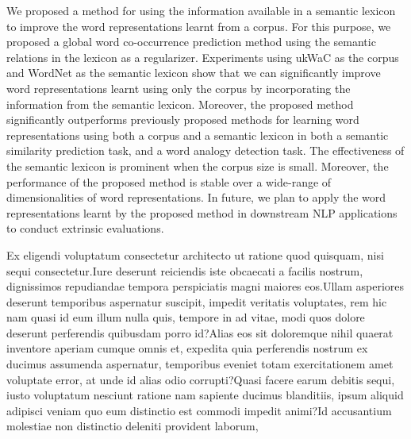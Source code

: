 \documentclass[letterpaper]{article}
\begin{document}
We proposed a method for using the information available in a semantic lexicon to improve the word representations
learnt from a corpus. For this purpose, we proposed a global word co-occurrence prediction method using the semantic relations
in the lexicon as a regularizer. Experiments using ukWaC as the corpus and WordNet as the semantic lexicon show that
we can significantly improve word representations learnt using only the corpus by incorporating the information from the semantic lexicon.
Moreover, the proposed method significantly outperforms previously proposed methods for learning word representations
using both a corpus and a semantic lexicon in both a semantic similarity prediction task, and a word analogy detection task.
The effectiveness of the semantic lexicon is prominent when the corpus size is small. Moreover, the performance
of the proposed method is stable over a wide-range of dimensionalities of word representations.
In future, we plan to apply the word representations learnt by the proposed method in downstream NLP applications
to conduct extrinsic evaluations.


  Ex eligendi voluptatum consectetur architecto ut ratione quod quisquam, nisi sequi consectetur.Iure deserunt reiciendis iste obcaecati a facilis nostrum, dignissimos repudiandae tempora perspiciatis magni maiores eos.Ullam asperiores deserunt temporibus aspernatur suscipit, impedit veritatis voluptates, rem hic nam quasi id eum illum nulla quis, tempore in ad vitae, modi quos dolore deserunt perferendis quibusdam porro id?Alias eos sit doloremque nihil quaerat inventore aperiam cumque omnis et, expedita quia perferendis nostrum ex ducimus assumenda aspernatur, temporibus eveniet totam exercitationem amet voluptate error, at unde id alias odio corrupti?Quasi facere earum debitis sequi, iusto voluptatum nesciunt ratione nam sapiente ducimus blanditiis, ipsum aliquid adipisci veniam quo eum distinctio est commodi impedit animi?Id accusantium molestiae non distinctio deleniti provident laborum,

\end{document}
